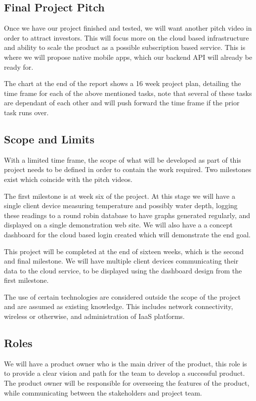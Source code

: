 \documentclass[11pt, oneside, a4paper, titlepage]{article}
\begin{document}
\subsection{Final Project Pitch}
Once we have our project finished and tested, we will want another pitch video in order to attract investors.  This will focus more on the cloud based infrastructure and ability to scale the product as a possible subscription based service.  This is where we will propose native mobile apps, which our backend API will already be ready for.  

The chart at the end of the report shows a 16 week project plan, detailing the time frame for each of the above mentioned tasks, note that several of these tasks are dependant of each other and will push forward the time frame if the prior task runs over. 

\subsection{Scope and Limits}
With a limited time frame, the scope of what will be developed as part of this project needs to be defined in order to contain the work required.  Two milestones exist which coincide with the pitch videos.   

The first milestone is at week six of the project. At this stage we will have a single client device measuring temperature and possibly water depth, logging these readings to a round robin database to have graphs generated regularly, and displayed on a single demonstration web site.  We will also have a a concept dashboard for the cloud based login created which will demonstrate the end goal. 

This project will be completed at the end of sixteen weeks, which is the second and final milestone. We will have multiple client devices communicating their data to the cloud service, to be displayed using the dashboard design from the first milestone.  

The use of certain technologies are considered outside the scope of the project and are assumed as existing knowledge.  This includes network connectivity, wireless or otherwise, and administration of IaaS platforms. 

\subsection{Roles}
We will have a product owner who is the main driver of the product, this role is to provide a clear vision and path for the team to develop a successful product. The product owner will be responsible for overseeing the features of the product, while communicating between the stakeholders and project team. 
\end{document}
